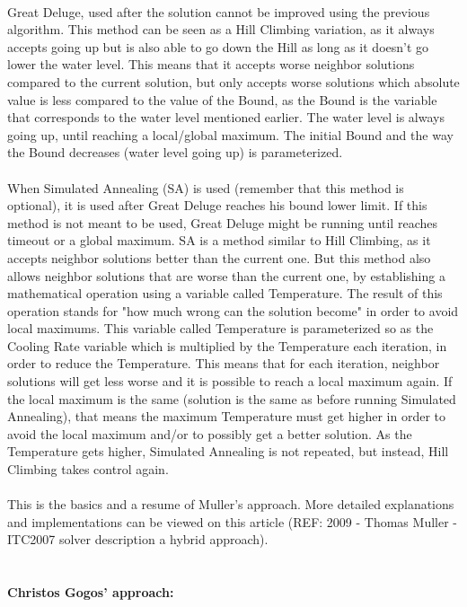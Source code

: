 \\
Great Deluge, used after the solution cannot be improved using the previous algorithm. This method can be seen as a Hill Climbing variation, as it always accepts going up but is also able to go down the Hill as long as it doesn't go lower the water level. This means that it accepts worse neighbor solutions compared to the current solution, but only accepts worse solutions which absolute value is less compared to the value of the Bound, as the Bound is the variable that corresponds to the water level mentioned earlier. The water level is always going up, until reaching a local/global maximum. The initial Bound and the way the Bound decreases (water level going up) is parameterized.\\
\\
When Simulated Annealing (SA) is used (remember that this method is optional), it is used after Great Deluge reaches his bound lower limit. If this method is not meant to be used, Great Deluge might be running until reaches timeout or a global maximum. SA is a method similar to Hill Climbing, as it accepts neighbor solutions better than the current one. But this method also allows neighbor solutions that are worse than the current one, by establishing a mathematical operation using a variable called Temperature. The result of this operation stands for "how much wrong can the solution become" in order to avoid local maximums. This variable called Temperature is parameterized so as the Cooling Rate variable which is multiplied by the Temperature each iteration, in order to reduce the Temperature. This means that for each iteration, neighbor solutions will get less worse and it is possible to reach a local maximum again. If the local maximum is the same (solution is the same as before running Simulated Annealing), that means the maximum Temperature must get higher in order to avoid the local maximum and/or to possibly get a better solution. As the Temperature gets higher, Simulated Annealing is not repeated, but instead, Hill Climbing takes control again.\\
\\
This is the basics and a resume of Muller's approach. More detailed explanations and implementations can be viewed on this article (REF: 2009 - Thomas Muller - ITC2007 solver description a hybrid approach).\\
\\
\paragraph{\textbf{Christos Gogos' approach:}}

